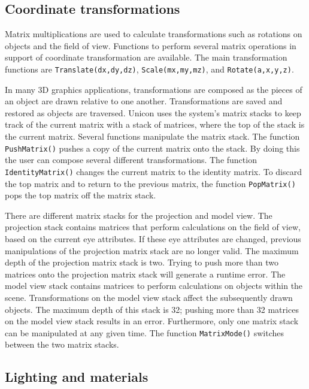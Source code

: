 \subsection*{Coordinate transformations}

Matrix multiplications are used to calculate transformations such as rotations
on objects and the field of view. Functions to perform several matrix
operations in support of coordinate transformation are available. The main
transformation functions are \texttt{Translate(dx,dy,dz)},
\texttt{Scale(mx,my,mz)}, and \texttt{Rotate(a,x,y,z)}.

In many 3D graphics applications, transformations are composed as the
pieces of an object are drawn relative to one another. Transformations
are saved and restored as objects are traversed.  Unicon uses the
system's matrix stacks to keep track of the current matrix with a
stack of matrices, where the top of the stack is the current matrix.
Several functions manipulate the matrix stack. The function
\texttt{PushMatrix()} pushes a copy of the current matrix onto the
stack. By doing this the user can compose several different
transformations. The function \texttt{IdentityMatrix()} changes the
current matrix to the identity matrix. To discard the top matrix and
to return to the previous matrix, the function \texttt{PopMatrix()}
pops the top matrix off the matrix stack.

There are different matrix stacks for the projection and model
view. The projection stack contains matrices that perform calculations
on the field of view, based on the current eye attributes. If these
eye attributes are changed, previous manipulations of the projection
matrix stack are no longer valid. The maximum depth of the projection
matrix stack is two. Trying to push more than two matrices onto the
projection matrix stack will generate a runtime error. The model view
stack contains matrices to perform calculations on objects within the
scene. Transformations on the model view stack affect the subsequently
drawn objects. The maximum depth of this stack is 32; pushing more
than 32 matrices on the model view stack results in an
error. Furthermore, only one matrix stack can be manipulated at any
given time. The function \texttt{MatrixMode()} switches between the
two matrix stacks.

\subsection*{Lighting and materials}

